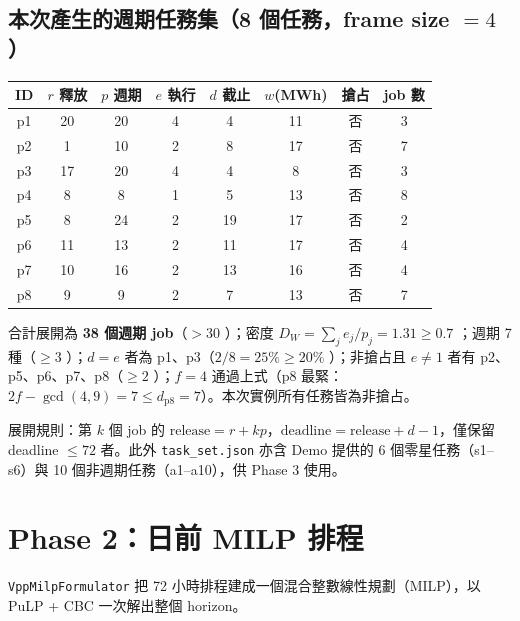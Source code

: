 \documentclass[12pt,a4paper,fontset=none]{ctexart}
\newcommand{\fn}[1]{\texttt{\small #1}}
\begin{document}
\subsection{本次產生的週期任務集（8 個任務，frame size $=4$）}
\begin{center}
\begin{tabularx}{\linewidth}{cccccccc}
\toprule
\textbf{ID} & \textbf{$r$ 釋放} & \textbf{$p$ 週期} & \textbf{$e$ 執行} & \textbf{$d$ 截止} & \textbf{$w$(MWh)} & \textbf{搶占} & \textbf{job 數} \\
\midrule
p1 & 20 & 20 & 4 & 4  & 11 & 否 & 3 \\
p2 & 1  & 10 & 2 & 8  & 17 & 否 & 7 \\
p3 & 17 & 20 & 4 & 4  & 8  & 否 & 3 \\
p4 & 8  & 8  & 1 & 5  & 13 & 否 & 8 \\
p5 & 8  & 24 & 2 & 19 & 17 & 否 & 2 \\
p6 & 11 & 13 & 2 & 11 & 17 & 否 & 4 \\
p7 & 10 & 16 & 2 & 13 & 16 & 否 & 4 \\
p8 & 9  & 9  & 2 & 7  & 13 & 否 & 7 \\
\bottomrule
\end{tabularx}
\end{center}
合計展開為 \textbf{38 個週期 job}（$>30$ \checkmark）；密度 $D_W = \sum_j e_j/p_j = 1.31 \ge 0.7$ \checkmark；週期 7 種（$\ge 3$ \checkmark）；$d=e$ 者為 p1、p3（$2/8 = 25\%\ge 20\%$ \checkmark）；非搶占且 $e\neq 1$ 者有 p2、p5、p6、p7、p8（$\ge 2$ \checkmark）；$f=4$ 通過上式（p8 最緊：$2f-\gcd(4,9)=7\le d_{\text{p8}}=7$）\checkmark。本次實例所有任務皆為非搶占。

\noindent 展開規則：第 $k$ 個 job 的 $\text{release}=r+kp$，$\text{deadline}=\text{release}+d-1$，僅保留 deadline $\le 72$ 者。此外 \fn{task\_set.json} 亦含 Demo 提供的 6 個零星任務（s1--s6）與 10 個非週期任務（a1--a10），供 Phase 3 使用。

\section{Phase 2：日前 MILP 排程}
\fn{VppMilpFormulator} 把 72 小時排程建成一個混合整數線性規劃（MILP），以 PuLP + CBC 一次解出整個 horizon。
\end{document}
